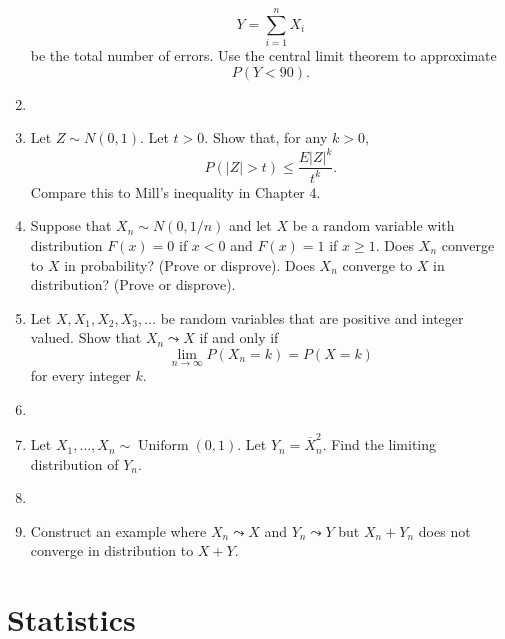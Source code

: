\documentclass{article}
\begin{document}
\begin{enumerate}
	$$
	Y = \sum_{i = 1}^n X_i
	$$
	be the total number of errors. Use the central limit theorem to approximate
	$$
	P(Y < 90).
	$$
	\item
	\item Let $Z \sim N(0, 1)$. Let $t > 0$. Show that, for any $k > 0$,
	$$
	P(|Z| > t) \leq \frac{E|Z|^k}{t^k}.
	$$
	Compare this to Mill's inequality in Chapter 4.
	\item Suppose that $X_n \sim N(0, 1/n)$ and let $X$ be a random variable with distribution $F(x) = 0$ if $x < 0$ and $F(x) = 1$ if $x \geq 1$. Does $X_n$ converge to $X$ in probability? (Prove or disprove). Does $X_n$ converge to $X$ in distribution? (Prove or disprove).
	\item Let $X, X_1, X_2, X_3, \dots$ be random variables that are positive and integer valued. Show that $X_n \leadsto X$ if and only if
	$$
	\lim_{n \rightarrow \infty} P(X_n = k) = P(X = k)
	$$
	for every integer $k$.
	\item
	\item Let $X_1, \dots, X_n \sim \operatorname{Uniform}(0, 1)$. Let $Y_n = \overline{X}_n^2$. Find the limiting distribution of $Y_n$.
	\item
	\item Construct an example where $X_n \leadsto X$ and $Y_n \leadsto Y$ but $X_n + Y_n$ does not converge in distribution to $X + Y$.
\end{enumerate}

\section{Statistics}
\end{document}
